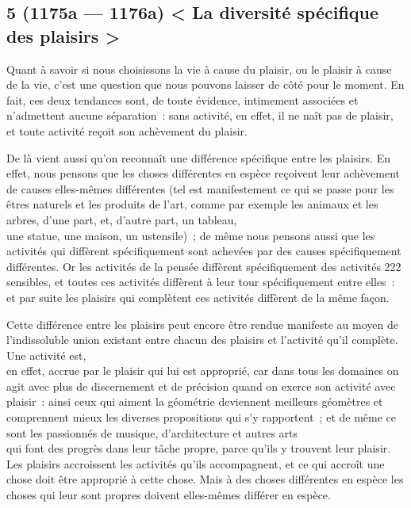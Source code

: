 \documentclass[french,twoside]{book} %
\begin{document}
\subsection[{5 (1175a — 1176a) < La diversité spécifique des plaisirs >}]{5 (1175a — 1176a) < La diversité spécifique des plaisirs >}
\noindent Quant à savoir si nous choisissons la vie à cause du plaisir, ou le plaisir à cause de la vie, c’est une question que nous pouvons laisser de côté pour le moment. En fait, ces deux tendances sont, de toute évidence, intimement associées et \\
n’admettent aucune séparation : sans activité, en effet, il ne naît pas de plaisir, et toute activité reçoit son achèvement du plaisir.\par
De là vient aussi qu’on reconnaît une différence spécifique entre les plaisirs. En effet, nous pensons que les choses différentes en espèce reçoivent leur achèvement de causes elles-mêmes différentes (tel est manifestement ce qui se passe pour les êtres naturels et les produits de l’art, comme par exemple les animaux et les arbres, d’une part, et, d’autre part, un tableau, \\
une statue, une maison, un ustensile) ; de même nous pensons aussi que les activités qui diffèrent spécifiquement sont achevées par des causes spécifiquement différentes. Or les activités de la pensée diffèrent spécifiquement des activités 222 sensibles, et toutes ces activités diffèrent à leur tour spécifiquement entre elles : et par suite les plaisirs qui complètent ces activités diffèrent de la même façon.\par
Cette différence entre les plaisirs peut encore être rendue manifeste au moyen de l’indissoluble union existant entre chacun des plaisirs et l’activité qu’il complète. Une activité est, \\
en effet, accrue par le plaisir qui lui est approprié, car dans tous les domaines on agit avec plus de discernement et de précision quand on exerce son activité avec plaisir : ainsi ceux qui aiment la géométrie deviennent meilleurs géomètres et comprennent mieux les diverses propositions qui s’y rapportent ; et de même ce sont les passionnés de musique, d’architecture et autres arts \\
qui font des progrès dans leur tâche propre, parce qu’ils y trouvent leur plaisir. Les plaisirs accroissent les activités qu’ils accompagnent, et ce qui accroît une chose doit être approprié à  cette chose. Mais à des choses différentes en espèce les choses qui leur sont propres doivent elles-mêmes différer en espèce.\par
\end{document}
